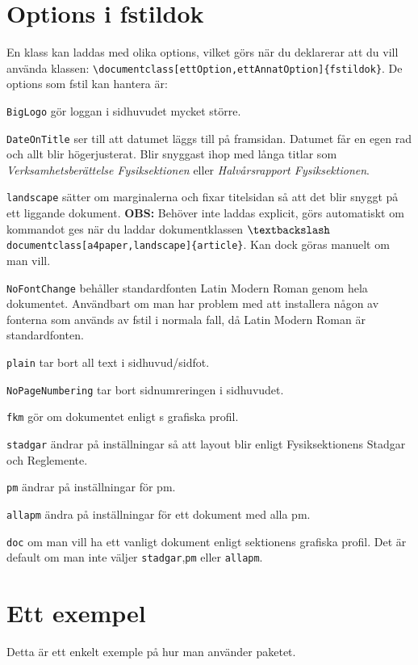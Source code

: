 \documentclass{fstildok}
\newcommand{\bs}{\textbackslash}
\begin{document}
\section{Options i fstildok}
En klass kan laddas med olika options, vilket görs när du deklarerar att du vill använda klassen: \texttt{\bs documentclass[ettOption,ettAnnatOption]\{fstildok\}}. De options som fstil kan hantera är:
\begin{punkter}
\punkt \texttt{BigLogo} gör loggan i sidhuvudet mycket större.

\punkt \texttt{DateOnTitle} ser till att datumet läggs till på framsidan. Datumet får en egen rad och allt blir högerjusterat. Blir snyggast ihop med långa titlar som \textit{Verksamhetsberättelse Fysiksektionen} eller \textit{Halvårsrapport Fysiksektionen}.

\punkt \texttt{landscape} sätter om marginalerna och fixar titelsidan så att det blir snyggt på ett liggande dokument. \textbf{OBS:} Behöver inte laddas explicit, görs automatiskt om kommandot ges när du laddar dokumentklassen \texttt{$\bs$documentclass[a4paper,landscape]\{article\}}. Kan dock göras manuelt om man vill.

\punkt \texttt{NoFontChange} behåller standardfonten Latin Modern Roman genom hela dokumentet. Användbart om man har problem med att installera någon av fonterna som används av fstil i normala fall, då Latin Modern Roman är standardfonten.

\punkt \texttt{plain} tar bort all text i sidhuvud/sidfot.

\punkt \texttt{NoPageNumbering} tar bort sidnumreringen i sidhuvudet.

\punkt \texttt{fkm} gör om dokumentet enligt \fkm s grafiska profil.

\punkt \texttt{stadgar} ändrar på inställningar så att layout blir enligt Fysiksektionens Stadgar och Reglemente.

\punkt \texttt{pm} ändrar på inställningar för pm.

\punkt \texttt{allapm} ändra på inställningar för ett dokument med alla pm.

\punkt \texttt{doc} om man vill ha ett vanligt dokument enligt sektionens grafiska profil. Det är default om man inte väljer \texttt{stadgar},\texttt{pm} eller \texttt{allapm}.

\end{punkter}

\section{Ett exempel}
Detta är ett enkelt exemple på hur man använder paketet.
\end{document}
